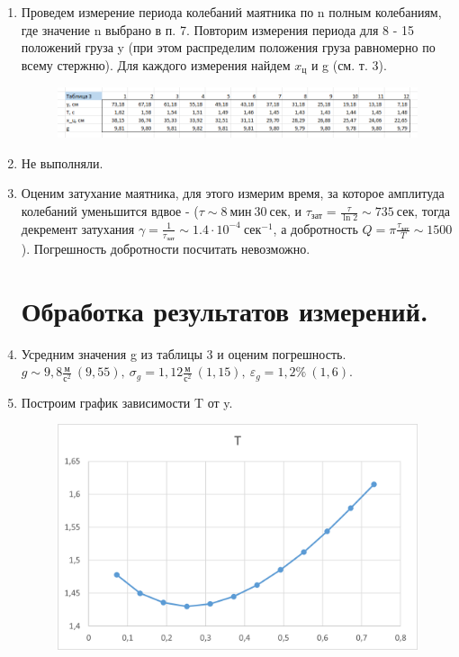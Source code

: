 \documentclass[a4paper,12pt]{article} %
\begin{document}
\begin{enumerate}
\item Проведем измерение периода колебаний маятника по n полным колебаниям, где значение n выбрано в п. 7. Повторим измерения периода для 8 - 15 положений груза y (при этом распределим положения груза равномерно по всему стержню). Для каждого измерения найдем $x_{\text{ц}}$ и g (см. т. 3).

\begin{figure} [h]
	\center
	\includegraphics[scale = 0.7]{./141/таблица 3.png}
\end{figure}

\item Не выполняли.

\item Оценим затухание маятника, для этого измерим время, за которое амплитуда колебаний уменьшится вдвое - ($\tau \sim 8\ \text{мин}\ 30\ \text{сек}$, и $\tau_{\text{зат}} = \frac{\tau}{\ln{2}} \sim 735\ \text{сек}$, тогда декремент затухания $\gamma = \frac{1}{\tau_{\text{зат}}} \sim 1.4 \cdot 10^{-4}\ \text{сек}^{-1}$, а добротность $Q = \pi \frac{\tau_{\text{зат}}}{T} \sim 1500$). Погрешность добротности посчитать невозможно.

\section{Обработка результатов измерений.}

\item Усредним значения g из таблицы 3 и оценим погрешность.
$g \sim 9,8 \frac{\text{м}}{\text{с}^2}\ (9,55),\ \sigma_g = 1,12 \frac{\text{м}}{\text{с}^2}\ (1,15),\ \varepsilon_g = 1,2\%\ (1,6)$.

\item Построим график зависимости T от y.

\begin{figure} [h]
	\center
	\includegraphics[scale = 0.8]{./141/T(y).png}
\end{figure}


\end{enumerate}
\end{document}
